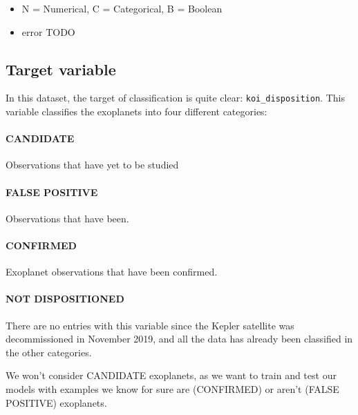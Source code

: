 \begin{itemize}[noitemsep,nolistsep]
  \item[\dagger] N = Numerical, C = Categorical, B = Boolean
  \item[\ddag] error TODO
\end{itemize}

\subsection{Target variable}

In this dataset, the target of classification is quite clear:
\texttt{koi\_disposition}. This variable classifies the exoplanets into
four different categories:

    \paragraph{CANDIDATE} Observations that have yet to be studied
    
    \paragraph{FALSE POSITIVE} Observations that have been.
    
    \paragraph{CONFIRMED} Exoplanet observations that have been confirmed.
    
    \paragraph{NOT DISPOSITIONED} There are no entries with this variable since the Kepler satellite was decommissioned
    in November 2019, and all the data has already been classified in the other categories.
    
We won't  consider CANDIDATE exoplanets, as we want to train and test our models with
examples we know for sure are (CONFIRMED) or aren't (FALSE POSITIVE) exoplanets.